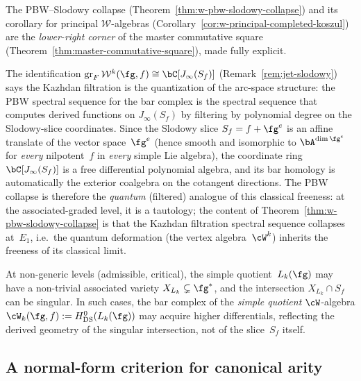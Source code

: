 \begin{remark}
\label{rem:pbw-slodowy-master-square}
The PBW--Slodowy collapse
(Theorem~\ref{thm:w-pbw-slodowy-collapse}) and its corollary for
principal $\mathcal{W}$-algebras
(Corollary~\ref{cor:w-principal-completed-koszul}) are the
\emph{lower-right corner} of the master commutative square
(Theorem~\ref{thm:master-commutative-square}), made fully explicit.

The identification $\operatorname{gr}_F \mathcal{W}^k(\fg, f)
\cong \bC[J_\infty(S_f)]$
(Remark~\ref{rem:jet-slodowy}) says the Kazhdan filtration is the
quantization of the arc-space structure: the PBW spectral sequence
for the bar complex is the spectral sequence that computes derived
functions on $J_\infty(S_f)$ by filtering by polynomial degree on
the Slodowy-slice coordinates.  Since the Slodowy slice
$S_f = f + \fg^e$ is an affine translate of the vector space~$\fg^e$
(hence smooth and isomorphic to $\bA^{\dim\fg^e}$ for \emph{every}
nilpotent~$f$ in \emph{every} simple Lie algebra), the coordinate ring
$\bC[J_\infty(S_f)]$ is a free differential polynomial algebra,
and its bar homology is automatically the exterior coalgebra on the
cotangent directions.  The PBW collapse is therefore the
\emph{quantum} (filtered) analogue of this classical freeness:
at the associated-graded level, it is a tautology; the content of
Theorem~\ref{thm:w-pbw-slodowy-collapse} is that the Kazhdan
filtration spectral sequence collapses at~$E_1$, i.e.\ the quantum
deformation (the vertex algebra~$\cW^k$) inherits the freeness of
its classical limit.

At non-generic levels (admissible, critical), the simple
quotient~$L_k(\fg)$ may have a non-trivial associated variety
$X_{L_k} \subsetneq \fg^*$, and the intersection
$X_{L_k} \cap S_f$ can be singular.  In such cases, the bar
complex of the \emph{simple quotient} $\cW$-algebra
$\cW_k(\fg,f) := H^0_{\mathrm{DS}}(L_k(\fg))$ may acquire
higher differentials, reflecting the derived geometry of the
singular intersection, not of the slice~$S_f$ itself.
\end{remark}

\subsection{A normal-form criterion for canonical arity}
\label{subsec:canonical-arity-detection}


